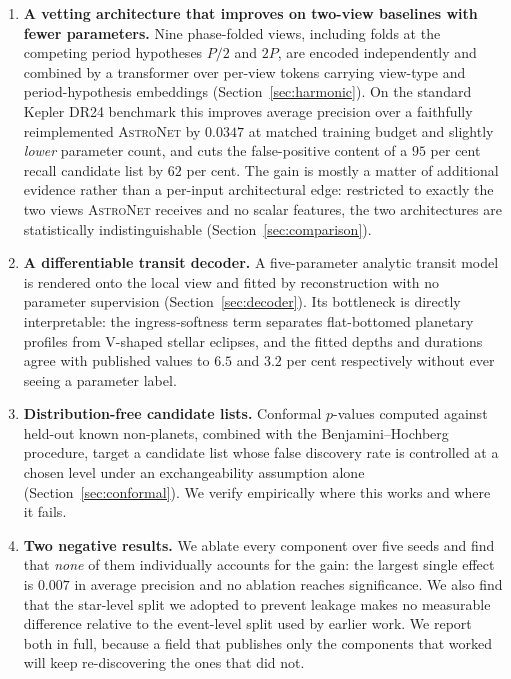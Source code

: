 \documentclass[preprint,12pt,authoryear]{elsarticle}
\newcommand{\astronet}{\textsc{AstroNet}}
\begin{document}
\begin{enumerate}
\item \textbf{A vetting architecture that improves on two-view baselines with
      fewer parameters.} Nine phase-folded views, including folds at the
      competing period hypotheses $P/2$ and $2P$, are encoded independently and
      combined by a transformer over per-view tokens carrying view-type and
      period-hypothesis embeddings (Section~\ref{sec:harmonic}). On the standard
      Kepler DR24 benchmark this improves average precision over a faithfully
      reimplemented \astronet{} by $0.0347$ at matched training budget and
      slightly \emph{lower} parameter count, and cuts the false-positive content
      of a $95$ per cent recall candidate list by $62$ per cent. The gain is
      mostly a matter of additional evidence rather than a per-input
      architectural edge: restricted to exactly the two views \astronet{}
      receives and no scalar features, the two architectures are statistically
      indistinguishable (Section~\ref{sec:comparison}).
\item \textbf{A differentiable transit decoder.} A five-parameter analytic
      transit model is rendered onto the local view and fitted by reconstruction
      with no parameter supervision (Section~\ref{sec:decoder}). Its bottleneck
      is directly interpretable: the ingress-softness term separates
      flat-bottomed planetary profiles from V-shaped stellar eclipses, and the
      fitted depths and durations agree with published values to $6.5$ and
      $3.2$ per cent respectively without ever seeing a parameter label.
\item \textbf{Distribution-free candidate lists.} Conformal $p$-values computed
      against held-out known non-planets, combined with the
      Benjamini--Hochberg procedure, target a candidate list whose false
      discovery rate is controlled at a chosen level under an exchangeability
      assumption alone (Section~\ref{sec:conformal}). We verify empirically
      where this works and where it fails.
\item \textbf{Two negative results.} We ablate every component over five seeds
      and find that \emph{none} of them individually accounts for the gain: the
      largest single effect is $0.007$ in average precision and no ablation
      reaches significance. We also find that the star-level split we adopted to
      prevent leakage makes no measurable difference relative to the
      event-level split used by earlier work. We report both in full, because a
      field that publishes only the components that worked will keep
      re-discovering the ones that did not.
\end{enumerate}
\end{document}
